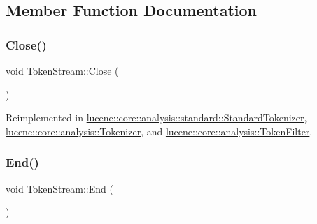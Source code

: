 \subsection{Member Function Documentation}
\mbox{\label{classlucene_1_1core_1_1analysis_1_1TokenStream_ad7963391ddbb2c75610e3738ba5155c8}} 
\subsubsection{\texorpdfstring{Close()}{Close()}}
{\footnotesize\ttfamily void Token\+Stream\+::\+Close (\begin{DoxyParamCaption}{ }\end{DoxyParamCaption})\hspace{0.3cm}{\ttfamily [virtual]}}



Reimplemented in \mbox{\hyperlink{classlucene_1_1core_1_1analysis_1_1standard_1_1StandardTokenizer_a108793659fb18bdd695e0c2be91ba730}{lucene\+::core\+::analysis\+::standard\+::\+Standard\+Tokenizer}}, \mbox{\hyperlink{classlucene_1_1core_1_1analysis_1_1Tokenizer_a95c3c0e37e3276be69fa0992b0e45e94}{lucene\+::core\+::analysis\+::\+Tokenizer}}, and \mbox{\hyperlink{classlucene_1_1core_1_1analysis_1_1TokenFilter_a4b991b01385423b87b5714061e4326c8}{lucene\+::core\+::analysis\+::\+Token\+Filter}}.

\mbox{\label{classlucene_1_1core_1_1analysis_1_1TokenStream_a4693985ca7fb242412049a074027b8b5}} 
\subsubsection{\texorpdfstring{End()}{End()}}
{\footnotesize\ttfamily void Token\+Stream\+::\+End (\begin{DoxyParamCaption}{ }\end{DoxyParamCaption})\hspace{0.3cm}{\ttfamily [virtual]}}



